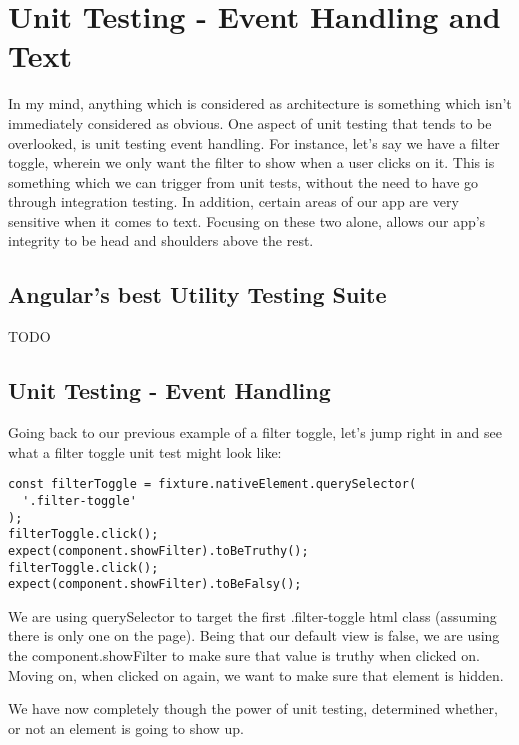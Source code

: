 \maketitle{}
\section{ Unit Testing - Event Handling and Text}
In my mind, anything which is considered as architecture is something which
isn't immediately considered as obvious. One aspect of unit testing that tends
to be overlooked, is unit testing event handling. For instance, let's say we
have a filter toggle, wherein we only want the filter to show when a user clicks
on it. This is something which we can trigger from unit tests, without the need
to have go through integration testing. In addition, certain areas of our app
are very sensitive when it comes to text. Focusing on these two alone, allows
our app's integrity to be head and shoulders above the rest.

\subsection{ Angular's best Utility Testing Suite }

TODO

\subsection{ Unit Testing - Event Handling }
Going back to our previous example of a filter toggle, let's jump right in and
see what a filter toggle unit test might look like:

\begin{lstlisting}
const filterToggle = fixture.nativeElement.querySelector(
  '.filter-toggle'
);
filterToggle.click();
expect(component.showFilter).toBeTruthy();
filterToggle.click();
expect(component.showFilter).toBeFalsy();
\end{lstlisting}

We are using querySelector to target the first .filter-toggle html class
(assuming there is only one on the page). Being that our default view is false,
we are using the component.showFilter to make sure that value is truthy when
clicked on. Moving on, when clicked on again, we want to make sure that element
is hidden. 

We have now completely though the power of unit testing, determined whether, or
not an element is going to show up.
